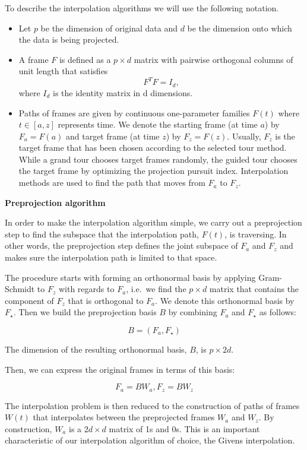 To describe the interpolation algorithms we will use the following notation.

\begin{itemize}
\item
  Let \(p\) be the dimension of original data and \(d\) be the dimension onto which the data is being projected.
\item
  A frame \(F\) is defined as a \(p\times d\) matrix with pairwise orthogonal columns of unit length that satisfies
  \[F^TF = I_d,\]
  where \(I_d\) is the identity matrix in d dimensions.
\item
  Paths of frames are given by continuous one-parameter families \(F(t)\) where \(t\in [a, z]\) represents time. We denote the starting frame (at time \(a\)) by \(F_a = F(a)\) and target frame (at time \(z\)) by \(F_z = F(z)\). Usually, \(F_z\) is the target frame that has been chosen according to the selected tour method. While a grand tour chooses target frames randomly, the guided tour chooses the target frame by optimizing the projection pursuit index. Interpolation methods are used to find the path that moves from \(F_a\) to \(F_z\).
\end{itemize}

\textbf{Preprojection algorithm}

In order to make the interpolation algorithm simple, we carry out a preprojection step to find the subspace that the interpolation path, \(F(t)\), is traversing. In other words, the preprojection step defines the joint subspace of \(F_a\) and \(F_z\) and makes sure the interpolation path is limited to that space.

The procedure starts with forming an orthonormal basis by applying Gram-Schmidt to \(F_z\) with regards to \(F_a\), i.e.~we find the \(p\times d\) matrix that contains the component of \(F_z\) that is orthogonal to \(F_a\). We denote this orthonormal basis by \(F_\star\). Then we build the preprojection basis \(B\) by combining \(F_a\) and \(F_\star\) as follows:

\[B = (F_a, F_{\star})\]

The dimension of the resulting orthonormal basis, \(B\), is \(p\times 2d\).

Then, we can express the original frames in terms of this basis:

\[F_a = B W_a, F_z = B W_z\]

The interpolation problem is then reduced to the construction of paths of frames \(W(t)\) that interpolates between the preprojected frames \(W_a\) and \(W_z\). By construction, \(W_a\) is a \(2d\times d\) matrix of 1s and 0s. This is an important characteristic of our interpolation algorithm of choice, the Givens interpolation.

